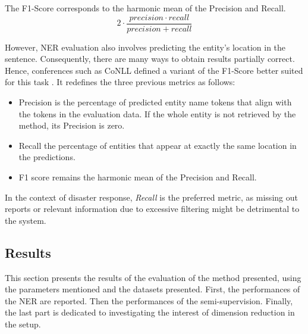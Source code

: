 The F1-Score corresponds to the harmonic mean of the Precision and Recall.
\[2\cdot \frac{precision\cdot recall}{precision + recall}\]

However, NER evaluation also involves predicting the entity's location in the sentence.
Consequently, there are many ways to obtain results partially correct.
Hence, conferences such as CoNLL defined a variant of the F1-Score better suited for this task \parencite{tjongkimsangIntroductionCoNLL2003Shared2003}.
It redefines the three previous metrics as follows:

\begin{itemize}
    \item Precision is the percentage of predicted entity name tokens that align with the tokens in the evaluation data.
          If the whole entity is not retrieved by the method, its Precision is zero.
    \item Recall the percentage of entities that appear at exactly the same location in the predictions.
    \item F1 score remains the harmonic mean of the Precision and Recall.
\end{itemize}

In the context of disaster response, \emph{Recall} is the preferred metric, as missing out reports or relevant information due to excessive filtering might be detrimental to the system.


\subsection{Results}
This section presents the results of the evaluation of the method presented, using the
parameters mentioned and the datasets presented.
First, the performances of the NER are reported.
Then the performances of the semi-supervision.
Finally, the last part is dedicated to investigating the interest of dimension reduction in the setup.

